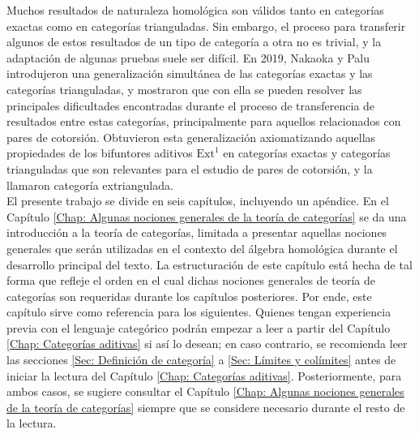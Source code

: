 \documentclass[tesis]{subfiles}
\begin{document}
Muchos resultados de naturaleza homológica son válidos tanto en categorías exactas como en categorías trianguladas. Sin embargo, el proceso para transferir algunos de estos resultados de un tipo de categoría a otra no es trivial, y la adaptación de algunas pruebas suele ser difícil. En 2019, Nakaoka y Palu\cite{NakaokaPalu} introdujeron una generalización simultánea de las categorías exactas y las categorías trianguladas, y mostraron que con ella se pueden resolver las principales dificultades encontradas durante el proceso de transferencia de resultados entre estas categorías, principalmente para aquellos relacionados con pares de cotorsión. Obtuvieron esta generalización axiomatizando aquellas propiedades de los bifuntores aditivos $\text{Ext}_{}^{1}$ en categorías exactas y categorías trianguladas que son relevantes para el estudio de pares de cotorsión, y la llamaron categoría extriangulada. \\

El presente trabajo se divide en seis capítulos, incluyendo un apéndice. En el Capítulo \ref{Chap: Algunas nociones generales de la teoría de categorías} se da una introducción a la teoría de categorías, limitada a presentar aquellas nociones generales que serán utilizadas en el contexto del álgebra homológica durante el desarrollo principal del texto. La estructuración de este capítulo está hecha de tal forma que refleje el orden en el cual dichas nociones generales de teoría de categorías son requeridas durante los capítulos posteriores. Por ende, este capítulo sirve como referencia para los siguientes. Quienes tengan experiencia previa con el lenguaje categórico podrán empezar a leer a partir del Capítulo \ref{Chap: Categorías aditivas} si así lo desean; en caso contrario, se recomienda leer las secciones \ref{Sec: Definición de categoría} a \ref{Sec: Límites y colímites} antes de iniciar la lectura del Capítulo \ref{Chap: Categorías aditivas}. Posteriormente, para ambos casos, se sugiere consultar el Capítulo \ref{Chap: Algunas nociones generales de la teoría de categorías} siempre que se considere necesario durante el resto de la lectura. \\
\end{document}
